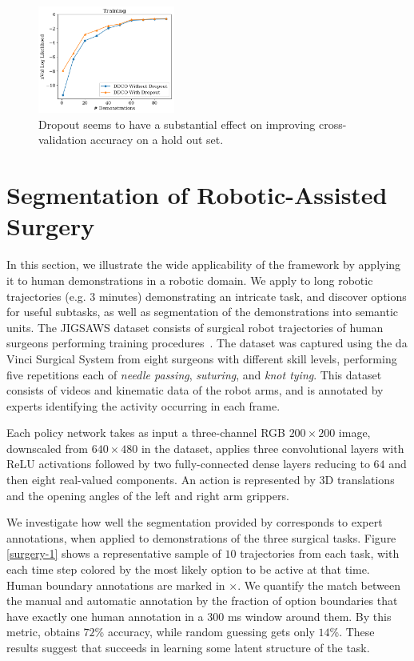 \begin{figure} [ht!]
\centering
    \includegraphics[width=0.4\textwidth]{ddco-experiments/exp9.png}
    \caption{Dropout seems to have a substantial effect on improving cross-validation accuracy on a hold out set. \label{fig:exp9}}
\end{figure}

\section{Segmentation of Robotic-Assisted Surgery}
In this section, we illustrate the wide applicability of the \alg framework by applying it to human demonstrations in a robotic domain. We apply \alg to long robotic trajectories (e.g. 3 minutes) demonstrating an intricate task, and discover options for useful subtasks, as well as segmentation of the demonstrations into semantic units.
The JIGSAWS dataset consists of surgical robot trajectories of human surgeons performing training procedures~\cite{gao2014jigsaws}. 
The dataset was captured using the da Vinci Surgical System from eight surgeons with different skill levels, performing five repetitions each of \emph{needle passing}, \emph{suturing}, and \emph{knot tying}.
This dataset consists of videos and kinematic data of the robot arms, and is annotated by experts identifying the activity occurring in each frame.

Each policy network takes as input a three-channel RGB $200 \times 200$ image, downscaled from $640 \times 480$ in the dataset, applies three convolutional layers with ReLU activations followed by two fully-connected dense layers reducing to $64$ and then eight real-valued components. An action is represented by 3D translations and the opening angles of the left and right arm grippers.

We investigate how well the segmentation provided by \alg corresponds to expert annotations, when applied to demonstrations of the three surgical tasks. Figure \ref{surgery-1} shows a representative sample of $10$ trajectories from each task, with each time step colored by the most likely option to be active at that time. Human boundary annotations are marked in $\times$. We quantify the match between the manual and automatic annotation by the fraction of option boundaries that have exactly one human annotation in a $300$ ms window around them. By this metric, \alg obtains $72$\% accuracy, while random guessing gets only $14$\%. These results suggest that \alg succeeds in learning some latent structure of the task.

